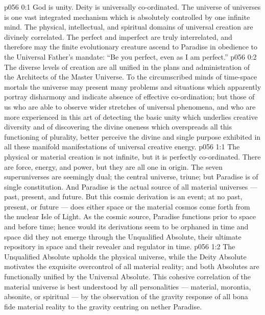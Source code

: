 \author{Mighty Messenger and Machiventa Melchizedek}
\vs p056 0:1 God is unity. Deity is universally co\hyp{}ordinated. The universe of universes is one vast integrated mechanism which is absolutely controlled by one infinite mind. The physical, intellectual, and spiritual domains of universal creation are divinely correlated. The perfect and imperfect are truly interrelated, and therefore may the finite evolutionary creature ascend to Paradise in obedience to the Universal Father’s mandate: “Be you perfect, even as I am perfect.”
\vs p056 0:2 The diverse levels of creation are all unified in the plans and administration of the Architects of the Master Universe. To the circumscribed minds of time\hyp{}space mortals the universe may present many problems and situations which apparently portray disharmony and indicate absence of effective co\hyp{}ordination; but those of us who are able to observe wider stretches of universal phenomena, and who are more experienced in this art of detecting the basic unity which underlies creative diversity and of discovering the divine oneness which overspreads all this functioning of plurality, better perceive the divine and single purpose exhibited in all these manifold manifestations of universal creative energy.
\vs p056 1:1 The physical or material creation is not infinite, but it is perfectly co\hyp{}ordinated. There are force, energy, and power, but they are all one in origin. The seven superuniverses are seemingly dual; the central universe, triune; but Paradise is of single constitution. And Paradise is the actual source of all material universes --- past, present, and future. But this cosmic derivation is an  event; at no  past, present, or future --- does either space or the material cosmos come forth from the nuclear Isle of Light. As the cosmic source, Paradise functions prior to space and before time; hence would its derivations seem to be orphaned in time and space did they not emerge through the Unqualified Absolute, their ultimate repository in space and their revealer and regulator in time.
\vs p056 1:2 \pc The Unqualified Absolute upholds the physical universe, while the Deity Absolute motivates the exquisite overcontrol of all material reality; and both Absolutes are functionally unified by the Universal Absolute. This cohesive correlation of the material universe is best understood by all personalities --- material, morontia, absonite, or spiritual --- by the observation of the gravity response of all bona fide material reality to the gravity centring on nether Paradise.
